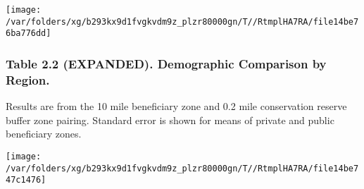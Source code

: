 \documentclass[landscape]{article}
\begin{document}
\texttt{[image: /var/folders/xg/b293kx9d1fvgkvdm9z\_plzr80000gn/T//RtmplHA7RA/file14be76ba776dd]}
\pagebreak

\hypertarget{table-2.2-expanded.-demographic-comparison-by-region.}{%
\subsubsection{Table 2.2 (EXPANDED). Demographic Comparison by
Region.}\label{table-2.2-expanded.-demographic-comparison-by-region.}}

Results are from the 10 mile beneficiary zone and 0.2 mile conservation
reserve buffer zone pairing. Standard error is shown for means of
private and public beneficiary zones.

\texttt{[image: /var/folders/xg/b293kx9d1fvgkvdm9z\_plzr80000gn/T//RtmplHA7RA/file14be747c1476]}
\end{document}
